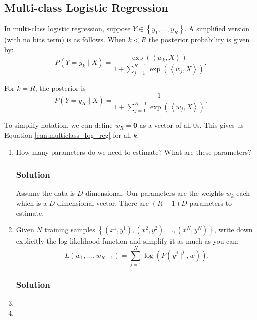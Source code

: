 \documentclass[letterpaper,11pt]{article}
\begin{document}
\subsection*{Multi-class Logistic Regression}

In multi-class logistic regression, suppose
$Y \in \left\{y_1,\ldots,y_R\right\}$. A simplified version (with no
bias term) is as follows. When $k < R$ the posterior probability is given by:
\begin{equation}
  P\left( Y = y_k \mid X\right) =
  \frac{\exp\left(\left\langle w_k, X\right\rangle\right)}
  {1 + \sum_{j=1}^{R-1}\exp\left(\left\langle w_j, X\right\rangle\right)}.
  \label{eqn:multiclass_log_reg}
\end{equation}

For $k = R$, the posterior is
\begin{equation}
  P\left( Y = y_R \mid X\right) =
  \frac{1}
  {1 + \sum_{j=1}^{R-1}\exp\left(\left\langle w_j, X\right\rangle\right)}.
\end{equation}

To simplify notation, we can define $w_R = \mathbf{0}$ as a vector of
all $0$s. This gives us Equation \ref{eqn:multiclass_log_reg} for all
$k$.

\begin{enumerate}
\item How many parameters do we need to estimate? What are these
  parameters?

  \subsubsection*{Solution}

  Assume the data is $D$-dimensional. Our parameters are the weights
  $w_k$ each which is a $D$-dimensional vector. There are
  $\boxed{(R - 1)D}$ parameters to estimate.
\item Given $N$ training samples
  $\left\{\left(x^1, y^1\right),\left(x^2,
      y^2\right),\ldots,\left(x^N, y^N\right)\right\}$, write down
  explicitly the log-likelihood function and simplify it as much as
  you can:
  \begin{equation}
    L\left(w_1,\ldots,w_{R-1}\right) = \sum_{j=1}^N \log\left(
      P\left(y^j \mid ^j,w\right)
    \right).
  \end{equation}
    
  \subsubsection*{Solution}
\item 
\item 
\end{enumerate}
\end{document}
